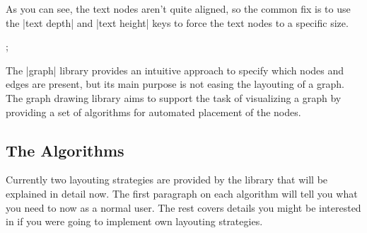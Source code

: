 As you can see, the text nodes aren't quite aligned, so the common fix
is to use the |text depth| and |text height| keys to force the text
nodes to a specific size.

\begin{codeexample}[]
\tikzpicture[graph drawing=standard tree, text depth=.2em, text height=.8em]
  ;
\endtikzpicture
\end{codeexample}

The |graph| library provides an intuitive approach to specify which nodes and edges are present, but its main purpose is not easing the layouting of a graph. The graph drawing library aims to support the task of visualizing a graph by providing a set of algorithms for automated placement of the nodes. 

\subsection{The Algorithms}
Currently two layouting strategies are provided by the library that will be explained in detail now. 
The first paragraph on each algorithm will tell you what you need to now as a normal user. The rest covers details you might be interested in if you were going to implement own layouting strategies.

